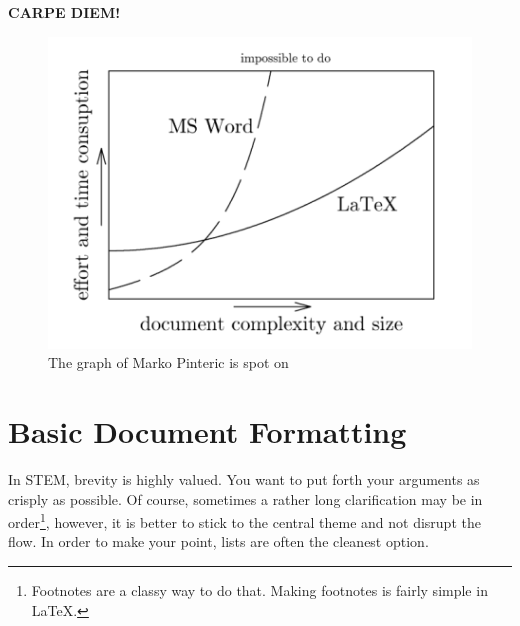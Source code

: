 \documentclass[a4paper]{article}
\newcommand{\latex}{\LaTeX\xspace}
\begin{document}
\begin{flushright}
\textbf{\textcolor{Sepia}{{\LARGE C}{\large ARPE} {\LARGE D}{\large IEM!}}}
\end{flushright}
\begin{figure}[H]
\centering
\includegraphics[scale=0.5]{ease-graph.png}
\caption{The graph of Marko Pinteric is spot on}
\end{figure}
\section{Basic Document Formatting}
In STEM, brevity is highly valued. You want to put forth your arguments as crisply as possible. Of course, sometimes a rather long clarification may be in order\renewcommand*{\thefootnote}{\arabic{footnote}}\footnote{Footnotes are a classy way to do that. Making footnotes is fairly simple in \latex.}, however, it is better to stick to the central theme and not disrupt the flow. In order to make your point, lists are often the cleanest option.\par
\end{document}

